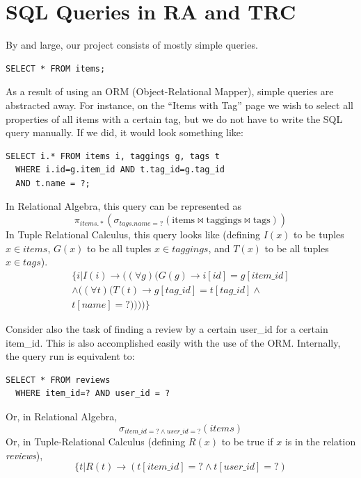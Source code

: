 \documentclass{acm_proc_article-sp}
\begin{document}
\section{SQL Queries in RA and TRC}
By and large, our project consists of mostly simple queries. 
\begin{centering}
\lstset{language=SQL}
\begin{lstlisting}
SELECT * FROM items;
\end{lstlisting}
\end{centering}

As a result of using an ORM (Object-Relational Mapper), simple queries are abstracted away. 
For instance, on the ``Items with Tag'' page we wish to select all properties of
all items with a certain tag, but we do not have to write the SQL query manually. If we did, it would look something
like:
\lstset{language=SQL}
\begin{lstlisting}
SELECT i.* FROM items i, taggings g, tags t 
  WHERE i.id=g.item_id AND t.tag_id=g.tag_id 
  AND t.name = ?;
\end{lstlisting}

In Relational Algebra, this query can be represented as
\[ \pi_{items.*}(\sigma_{tags.name=?}(\text{items}\bowtie\text{taggings}\bowtie\text{tags})) \]
In Tuple Relational Calculus, this query looks like (defining $I(x)$ to be tuples $x \in \textit{items}$,
$G(x)$ to be all tuples $x \in \textit{taggings}$, and $T(x)$ to be all tuples $x \in \textit{tags}$).
\begin{displaymath}
\begin{split} 
\{i | I(i) \to ((\forall g)(G(g) \to i[id] = g[item\_id] \\
\land ((\forall t)(T(t) \to g[tag\_id] = t[tag\_id] \land \\
t[name] = ?))))\}
\end{split}
\end{displaymath}

Consider also the task of finding a review by a certain user\_id for a certain item\_id. This is also
accomplished easily with the use of the ORM. Internally, the query run is equivalent to:
\begin{lstlisting}
SELECT * FROM reviews 
  WHERE item_id=? AND user_id = ?
\end{lstlisting}
Or, in Relational Algebra,
\[ \sigma_{item\_id=? \land user\_id=?}(\textit{items}) \]
Or, in Tuple-Relational Calculus (defining $R(x)$ to be true if $x$ is in the relation \textit{reviews}),
\[ \{ t | R(t) \to (t[item\_id]=? \land t[user\_id]=?) \]
\end{document}

